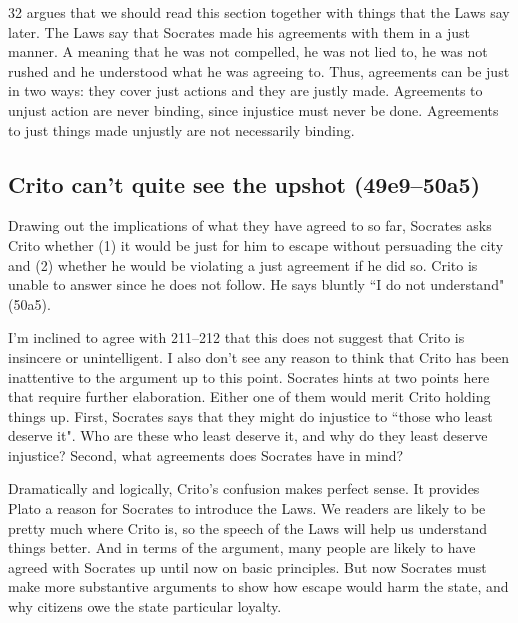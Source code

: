 \documentclass[11pt]{article}
\begin{document}
\citet{kraut1984} 32 argues that we should read this section together with things that the Laws say later.  The Laws say that Socrates made his agreements with them in a just manner.  A  meaning that he was not compelled, he was not lied to, he was not rushed and he understood what he was agreeing to.  Thus, agreements can be just in two ways: they cover just actions and they are justly made.  Agreements to unjust action are never binding, since injustice must never be done.  Agreements to just things made unjustly are not necessarily binding.

\subsection{Crito can't quite see the upshot (49e9--50a5)}

Drawing out the implications of what they have agreed to so far, Socrates asks Crito whether (1) it would be just for him to escape without persuading the city and (2) whether he would be violating a just agreement if he did so.  Crito is unable to answer since he does not follow.  He says bluntly ``I do not understand" (50a5).

I'm inclined to agree with \citet{brickhouse2004} 211--212 that this does not suggest that Crito is insincere or unintelligent.  I also don't see any reason to think that Crito has been inattentive to the argument up to this point.  Socrates hints at two points here that require further elaboration.  Either one of them would merit Crito holding things up.  First, Socrates says that they might do injustice to ``those who least deserve it". Who are these who least deserve it, and why do they least deserve injustice?  Second, what agreements does Socrates have in mind?

Dramatically and logically, Crito's confusion makes perfect sense.  It provides Plato a reason for Socrates to introduce the Laws.  We readers are likely to be pretty much where Crito is, so the speech of the Laws will help us understand things better.  And in terms of the argument, many people are likely to have agreed with Socrates up until now on basic principles.  But now Socrates must make more substantive arguments to show how escape would harm the state, and why citizens owe the state particular loyalty.

\end{document}
